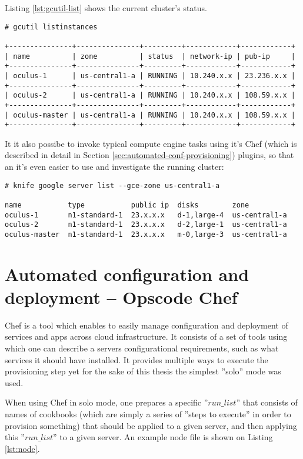 Listing \ref{lst:gcutil-list} shows the current cluster's status.


\label{lst:gcutil-list}
\begin{verbatim}
# gcutil listinstances

+---------------+---------------+---------+------------+------------+
| name          | zone          | status  | network-ip | pub-ip     |
+---------------+---------------+---------+------------+------------+
| oculus-1      | us-central1-a | RUNNING | 10.240.x.x | 23.236.x.x |
+---------------+---------------+---------+------------+------------+
| oculus-2      | us-central1-a | RUNNING | 10.240.x.x | 108.59.x.x |
+---------------+---------------+---------+------------+------------+
| oculus-master | us-central1-a | RUNNING | 10.240.x.x | 108.59.x.x |
+---------------+---------------+---------+------------+------------+
\end{verbatim}

It it also possibe to invoke typical compute engine tasks using it's Chef (which is described in detail in Section \ref{sec:automated-conf-provisioning}) plugins, so that an it's even easier to use and investigate the running cluster:

\begin{verbatim}
# knife google server list --gce-zone us-central1-a

name           type           public ip  disks        zone           
oculus-1       n1-standard-1  23.x.x.x   d-1,large-4  us-central1-a  
oculus-2       n1-standard-1  23.x.x.x   d-2,large-1  us-central1-a  
oculus-master  n1-standard-1  23.x.x.x   m-0,large-3  us-central1-a  
\end{verbatim}


\label{sec:automated-conf-provisioning}
\section{Automated configuration and deployment -- Opscode Chef}

Chef is a tool which enables to easily manage configuration and deployment of services and apps across cloud infrastructure. It consists of a set of tools using which one can describe a servers configurational requirements, such as what services it should have installed. It provides multiple ways to execute the provisioning step yet for the sake of this thesis the simplest ''solo'' mode was used. 

When using Chef in solo mode, one prepares a specific ''$run\_list$'' that consists of names of cookbooks (which are simply a series of ''steps to execute'' in order to provision something) that should be applied to a given server, and then applying this ''$run\_list$'' to a given server. An example node file is shown on Listing \ref{lst:node}.

